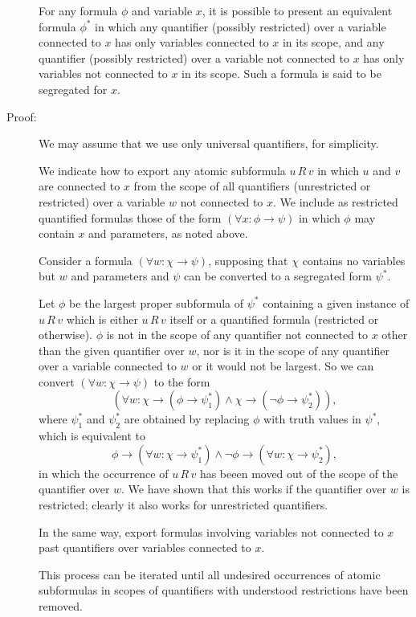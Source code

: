 \documentclass[12pt]{article}
\begin{document}
\begin{description}
For any formula $\phi$ and variable $x$, it is possible to present an equivalent formula $\phi^*$ in which any quantifier (possibly restricted) over a variable connected to $x$ has only variables connected to $x$ in its scope,
and any quantifier (possibly restricted) over a variable not connected to $x$ has only variables not connected to $x$ in its scope.  Such a formula is said to be segregated for $x$.  

\item[Proof:]  We may assume that we use only universal quantifiers, for simplicity.

We indicate how to export any atomic subformula $u \, R \, v$ in which $u$ and $v$ are connected to $x$ from the scope of all quantifiers (unrestricted or restricted) over a variable $w$ not connected to $x$.   We include as
restricted quantified formulas those of the form $(\forall x:\phi \rightarrow \psi)$ in which $\phi$ may contain $x$ and parameters, as noted above.

Consider a formula $(\forall w:\chi \rightarrow \psi)$, supposing that $\chi$ contains no variables but $w$ and parameters and $\psi$ can be converted to a segregated form $\psi^*$.

Let $\phi$ be the largest proper subformula of $\psi^*$ containing a given instance of $u \, R \, v$ which is either $u\,R\, v$ itself or a quantified formula (restricted or otherwise).  $\phi$ is not in the scope of any quantifier
not connected to $x$ other than the given quantifier over $w$, nor is it in the scope of any quantifier over a variable connected to $w$ or it would not be largest.  So we can convert  $(\forall w:\chi \rightarrow \psi)$ to the form
$$(\forall w:\chi \rightarrow (\phi \rightarrow \psi_1^*) \wedge \chi \rightarrow (\neg \phi \rightarrow \psi_2^*)),$$ where $\psi_1^*$ and $\psi_2^*$ are obtained by replacing $\phi$ with truth values in $\psi^*$, which is equivalent to $$\phi \rightarrow (\forall w:\chi \rightarrow \psi^*_1) \wedge \neg\phi \rightarrow (\forall w:\chi \rightarrow \psi^*_2),$$ in which the occurrence of $u \, R\, v$ has beeen moved out of the scope of the quantifier over $w$.  We have shown that this works if the quantifier over $w$ is restricted; clearly it also works for unrestricted quantifiers. 

In the same way, export formulas involving variables not connected to $x$ past quantifiers over variables connected to $x$.   

This process can be iterated until all undesired occurrences of atomic subformulas in scopes of quantifiers with understood restrictions have been removed.



\end{description}
\end{document}
